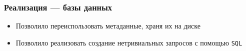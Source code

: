 \documentclass{beamer}
\begin{document}


%

\begin{frame}[fragile]
	\frametitle{Реализация --- базы данных}
	\begin{figure}
		\centering
		
	\end{figure}

	\begin{itemize}
		\item Позволило переиспользовать метаданные, храня их на диске
		\item Позволило реализовать создание нетривиальных запросов с помощью \texttt{SQL}
	\end{itemize}
\end{frame}
%
\end{document}
